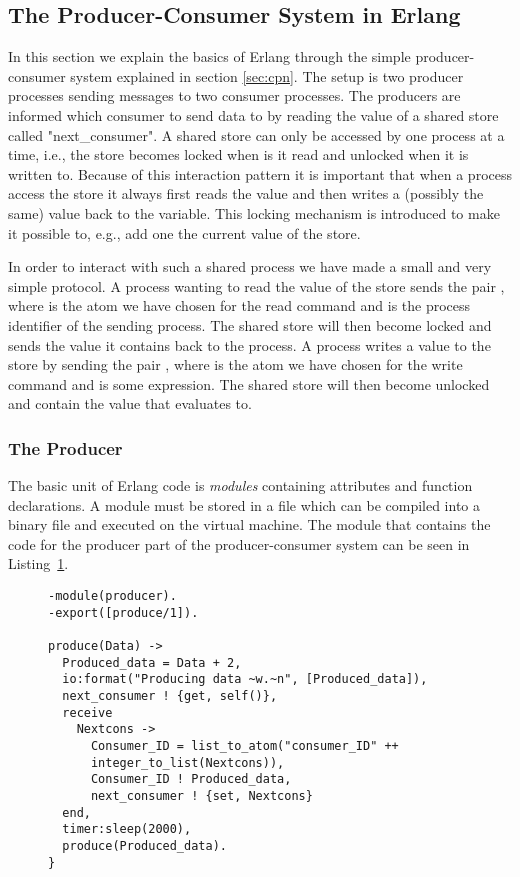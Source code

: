 \subsection{The Producer-Consumer System in Erlang}
\label{sec:producerconsumererlang}

In this section we explain the basics of Erlang through the simple
producer-consumer system explained in section \ref{sec:cpn}. The setup
is two producer processes sending messages to two consumer
processes. The producers are informed which consumer to send data to
by reading the value of a shared store called "next\_consumer". A
shared store can only be accessed by one process at a time, i.e., the
store becomes locked when is it read and unlocked when it is written
to. Because of this interaction pattern it is important that when a
process access the store it always first reads the value and then
writes a (possibly the same) value back to the variable. This locking
mechanism is introduced to make it possible to, e.g., add one the
current value of the store.

In order to interact with such a shared process we have made a small
and very simple protocol. A process wanting to read the value of the
store sends the pair , where  is the atom
we have chosen for the read command and  is the process
identifier of the sending process. The shared store will then become
locked and sends the value it contains back to the process. A process
writes a value to the store by sending the pair ,
where  is the atom we have chosen for the write command and
 is some expression. The shared store will then become
unlocked and contain the value that  evaluates to.

\subsubsection{The Producer}

The basic unit of Erlang code is \emph{modules} containing attributes
and function declarations. A module must be stored in a 
file which can be compiled into a binary  file and
executed on the virtual machine. The module that contains the code for
the producer part of the producer-consumer system can be seen in
Listing~\ref{fig:erlangproducer}.


\begin{figure}
\label{fig:erlangproducer}
\begin{verbatim}
-module(producer).
-export([produce/1]).

produce(Data) ->
  Produced_data = Data + 2,
  io:format("Producing data ~w.~n", [Produced_data]),
  next_consumer ! {get, self()},
  receive 
    Nextcons -> 
      Consumer_ID = list_to_atom("consumer_ID" ++
      integer_to_list(Nextcons)),
      Consumer_ID ! Produced_data,
      next_consumer ! {set, Nextcons}
  end,
  timer:sleep(2000),
  produce(Produced_data).
}
\end{verbatim}
\end{figure}


